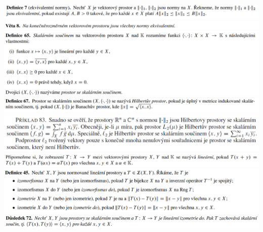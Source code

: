 \documentclass[12pt,a4paper]{article}
\begin{document}
\begin{center}
		\includegraphics[width=\textwidth]{img/2banHilb/2020-06-20 17 16 15.png}\vspace{0.3cm}
		\includegraphics[width=\textwidth]{img/2banHilb/2020-06-20 17 16 21.png}\vspace{0.3cm}
		\includegraphics[width=\textwidth]{img/2banHilb/2020-06-20 17 18 30.png}\vspace{0.3cm}
		\includegraphics[width=\textwidth]{img/2banHilb/2020-06-20 17 18 49.png}\vspace{0.3cm}
		\includegraphics[width=\textwidth]{img/2banHilb/2020-06-21 16 39 55.png}\vspace{0.3cm}
		\includegraphics[width=\textwidth]{img/2banHilb/2020-06-20 17 20 16.png}\vspace{0.3cm}
		\includegraphics[width=\textwidth]{img/2banHilb/2020-06-20 17 21 41.png}\vspace{0.3cm}
		\includegraphics[width=\textwidth]{img/2banHilb/2020-06-20 17 19 06.png}\vspace{0.3cm}

\end{center}
\end{document}
